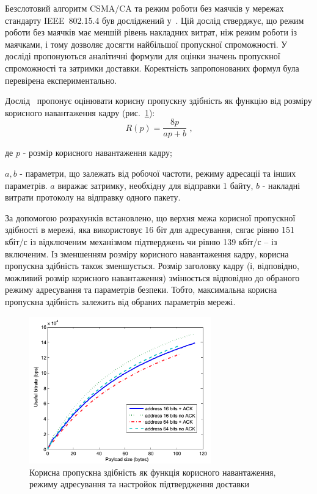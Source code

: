 \documentclass[a4paper,ukrainian,utf8,nocolumnsxix,floatsection,equationsection]{eskdtext}
\newcommand{\longcaption}[1]{\captionsetup{style=figureLongCaption}\caption{#1}}
\newcommand{\figref}[1]{рис.~\ref{#1}}
\newcommand{\iee}[0]{IEEE~802.15.4\xspace}
\newcommand{\csma}[0]{CSMA/CA\xspace}
\begin{document}
Безслотовий алгоритм \csma та режим роботи без маячків у мережах стандарту \iee був досліджений у~\cite{thoroughput:analysis:unslotted:ieee}. Цій дослід стверджує, що режим роботи без маячків має меншій рівень накладних витрат, ніж режим роботи із маячками, і тому дозволяє досягти найбільшої пропускної спроможності. У досліді пропонуються аналітичні формули для оцінки значень пропускної спроможності та затримки доставки. Коректність запропонованих формул була перевірена експериментально.

Дослід~\cite{thoroughput:analysis:unslotted:ieee} пропонує оцінювати корисну пропускну здібність як функцію від розміру корисного навантаження кадру (\figref{fig:throughput_graph}):
\begin{equation}\label{eq:throughput}
	R(p) = \frac{8p}{ap + b} \text{ ,}
\end{equation}

де $p$ - розмір корисного навантаження кадру;

$a,b$ - параметри, що залежать від робочої частоти, режиму адресації та інших параметрів. $a$ виражає затримку, необхідну для відправки 1 байту, $b$ - накладні витрати протоколу на відправку одного пакету.


За допомогою розрахунків встановлено, що верхня межа корисної пропускної здібності в мережі, яка використовує 16 біт для адресування, сягає рівню 151 кбіт/с із відключеним механізмом підтверджень чи рівню 139 кбіт/с – із включеним. Із зменшенням розміру корисного навантаження кадру, корисна пропускна здібність також зменшується. Розмір заголовку кадру (і, відповідно, можливий розмір корисного навантаження) змінюється відповідно до обраного режиму адресування та параметрів безпеки. Тобто, максимальна корисна пропускна здібність залежить від обраних параметрів мережі.

\begin{figure}[bth]
	\centering
	\includegraphics[width=0.7\textwidth]{img/throughput_graph.png}
	\longcaption{\label{fig:throughput_graph}Корисна пропускна здібність як функція корисного навантаження, режиму адресування та настройок підтвердження доставки}
\end{figure}
\end{document}
